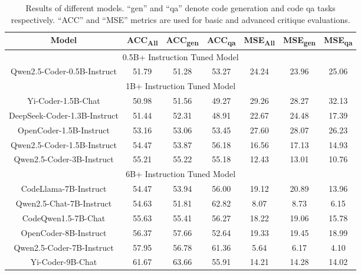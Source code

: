 \documentclass[11pt, a4paper, logo, copyright, nonumbering, amsart]{map}
\begin{document}
\begin{CJK*}{UTF8}{gbsn}
\begin{table}[!t]
    \centering \small
    \caption{Results of different models. ``gen'' and ``qa'' denote code generation and code qa tasks respectively. ``ACC'' and ``MSE'' metrics are used for basic and advanced critique evaluations.} \label{table:main_table}
    \begin{adjustbox}{width=0.8\textwidth}
    \begin{tabular}{c|cccccc}
    
    \toprule
    \textbf{Model} & \textbf{ACC\textsubscript{All}} & \textbf{ACC\textsubscript{gen}} & \textbf{ACC\textsubscript{qa}} & \textbf{MSE\textsubscript{All}} & \textbf{MSE\textsubscript{gen}} & \textbf{MSE\textsubscript{qa}} \\

    \midrule
    \multicolumn{7}{c}{0.5B+ Instruction Tuned Model} \\
    \midrule
    Qwen2.5-Coder-0.5B-Instruct & 51.79 & 51.28 & 53.27 & 24.24 & 23.96 & 25.06 \\
    
    \midrule
    \multicolumn{7}{c}{1B+ Instruction Tuned Model} \\
    \midrule
    Yi-Coder-1.5B-Chat & 50.98 & 51.56 & 49.27 & 29.26 & 28.27 & 32.13 \\
    DeepSeek-Coder-1.3B-Instruct & 51.44 & 52.31 & 48.91 & 22.67 & 24.48 & 17.39 \\
    OpenCoder-1.5B-Instruct & 53.16 & 53.06 & 53.45 & 27.60 & 28.07 & 26.23 \\
    Qwen2.5-Coder-1.5B-Instruct & 54.47 & 53.87 & 56.18 & 16.56 & 17.13 & 14.93 \\
    Qwen2.5-Coder-3B-Instruct & 55.21 & 55.22 & 55.18 & 12.43 & 13.01 & 10.76 \\

    \midrule
    \multicolumn{7}{c}{6B+ Instruction Tuned Model} \\
    \midrule
    CodeLlama-7B-Instruct & 54.47 & 53.94 & 56.00 & 19.12 & 20.89 & 13.96 \\
    Qwen2.5-Chat-7B-Instruct & 54.63 & 51.81 & 62.82 & 8.07 & 8.73 & 6.15 \\
    CodeQwen1.5-7B-Chat & 55.63 & 55.41 & 56.27 & 18.22 & 19.06 & 15.78 \\
    OpenCoder-8B-Instruct & 56.37 & 57.66 & 52.64 & 19.33 & 19.45 & 18.99 \\
    Qwen2.5-Coder-7B-Instruct & 57.95 & 56.78 & 61.36 & 5.64 & 6.17 & 4.10 \\
    Yi-Coder-9B-Chat & 61.67 & 63.66 & 55.91 & 14.21 & 14.28 & 14.02 \\


\end{tabular}
\end{adjustbox}
\end{table}
\end{CJK*}
\end{document}
